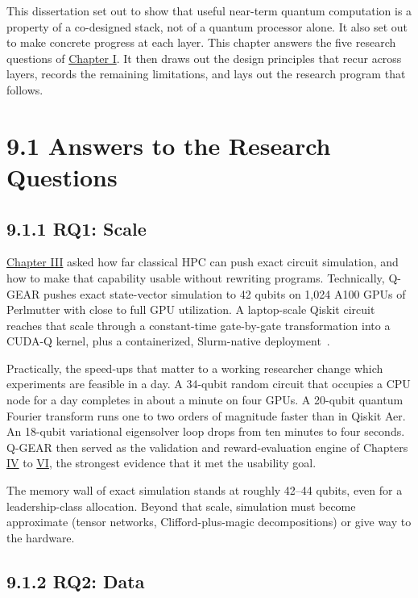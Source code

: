 \documentclass{report}
\theoremstyle{plain}
\theoremstyle{definition}
\theoremstyle{remark}
\begin{document}
This dissertation set out to show that useful near-term quantum computation is a property of a co-designed stack, not of a quantum processor alone. It also set out to make concrete progress at each layer. This chapter answers the five research questions of \hyperref[ch:intro]{Chapter I}. It then draws out the design principles that recur across layers, records the remaining limitations, and lays out the research program that follows.

\section{9.1 Answers to the Research Questions}\label{sec:conclusion:answers}

\subsection{9.1.1 RQ1: Scale}\label{sec:conclusion:rq1}

\hyperref[ch:qgear]{Chapter III} asked how far classical HPC can push exact circuit simulation, and how to make that capability usable without rewriting programs. Technically, Q-GEAR pushes exact state-vector simulation to 42 qubits on 1,024 A100 GPUs of Perlmutter with close to full GPU utilization. A laptop-scale Qiskit circuit reaches that scale through a constant-time gate-by-gate transformation into a CUDA-Q kernel, plus a containerized, Slurm-native deployment~\cite{guo2025qgear}.

Practically, the speed-ups that matter to a working researcher change which experiments are feasible in a day. A 34-qubit random circuit that occupies a CPU node for a day completes in about a minute on four GPUs. A 20-qubit quantum Fourier transform runs one to two orders of magnitude faster than in Qiskit Aer. An 18-qubit variational eigensolver loop drops from ten minutes to four seconds. Q-GEAR then served as the validation and reward-evaluation engine of Chapters \hyperref[ch:qml]{IV} to \hyperref[ch:synthesis]{VI}, the strongest evidence that it met the usability goal.

The memory wall of exact simulation stands at roughly 42--44 qubits, even for a leadership-class allocation. Beyond that scale, simulation must become approximate (tensor networks, Clifford-plus-magic decompositions) or give way to the hardware.

\subsection{9.1.2 RQ2: Data}\label{sec:conclusion:rq2}
\end{document}
